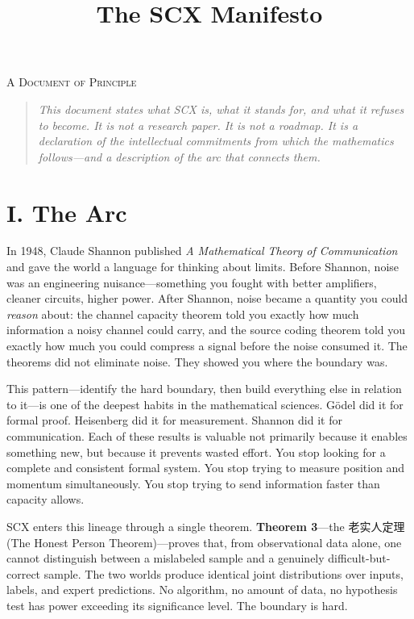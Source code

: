 \documentclass[11pt,a4paper]{article}
\title{\textbf{The SCX Manifesto}}
\author{}
\date{}
\theoremstyle{definition}
\begin{document}
\maketitle
\thispagestyle{empty}

\vspace{-1.5em}

\begin{center}
{\small \textsc{A Document of Principle}}
\end{center}

\vspace{1em}

\begin{quote}
\small
\textit{This document states what SCX is, what it stands for, and what it refuses to become. It is not a research paper. It is not a roadmap. It is a declaration of the intellectual commitments from which the mathematics follows---and a description of the arc that connects them.}
\end{quote}

\section*{I. The Arc}

In 1948, Claude Shannon published \textit{A Mathematical Theory of Communication} and gave the world a language for thinking about limits. Before Shannon, noise was an engineering nuisance---something you fought with better amplifiers, cleaner circuits, higher power. After Shannon, noise became a quantity you could \textit{reason} about: the channel capacity theorem told you exactly how much information a noisy channel could carry, and the source coding theorem told you exactly how much you could compress a signal before the noise consumed it. The theorems did not eliminate noise. They showed you where the boundary was.

This pattern---identify the hard boundary, then build everything else in relation to it---is one of the deepest habits in the mathematical sciences. G\"{o}del did it for formal proof. Heisenberg did it for measurement. Shannon did it for communication. Each of these results is valuable not primarily because it enables something new, but because it prevents wasted effort. You stop looking for a complete and consistent formal system. You stop trying to measure position and momentum simultaneously. You stop trying to send information faster than capacity allows.

SCX enters this lineage through a single theorem. \textbf{Theorem 3}---the 老实人定理 (The Honest Person Theorem)---proves that, from observational data alone, one cannot distinguish between a mislabeled sample and a genuinely difficult-but-correct sample. The two worlds produce identical joint distributions over inputs, labels, and expert predictions. No algorithm, no amount of data, no hypothesis test has power exceeding its significance level. The boundary is hard.
\end{document}
